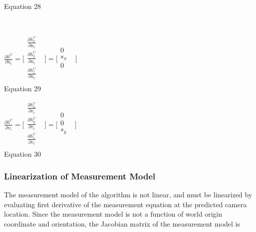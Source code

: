 Equation 28

\ \ \ \ 

$\frac{\partial h^{C}}{\partial u_{i}}=\lbrack \begin{matrix}
\frac{\partial h_{x}^{C}}{\partial u_{i}} & \\
\frac{\partial h_{y}^{C}}{\partial u_{i}} & \\
\frac{\partial h_{z}^{C}}{\partial u_{i}} & \\
\end{matrix}
\rbrack =\lbrack \begin{matrix}
0 & \\
s_{x} & \\
0 & \\
\end{matrix}
\rbrack $\\


Equation 29



$\frac{\partial h^{C}}{\partial v_{i}}=\lbrack \begin{matrix}
\frac{\partial h_{x}^{C}}{\partial v_{i}} & \\
\frac{\partial h_{y}^{C}}{\partial v_{i}} & \\
\frac{\partial h_{z}^{C}}{\partial v_{i}} & \\
\end{matrix}
\rbrack =\lbrack \begin{matrix}
0 & \\
0 & \\
s_{y} & \\
\end{matrix}
\rbrack $\\


Equation 30



\subsubsection{Linearization of Measurement Model}
The measurement model of the algorithm is not linear, and must be 
linearized by evaluating first derivative of the measurement equation at 
the predicted camera location. Since the measurement model is not a 
function of world origin coordinate and orientation, the Jacobian matrix 
of the measurement model is\ \ \ \ 

